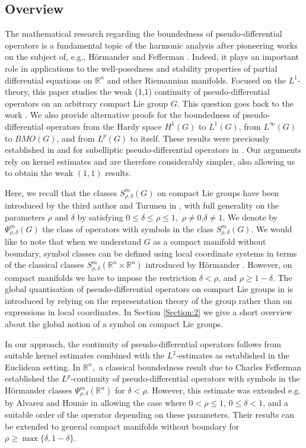 \documentclass[12pt, reqno]{amsart}
\theoremstyle{definition}
\theoremstyle{remark}
\numberwithin{equation}{section}
\begin{document}
\subsection{Overview} The mathematical research regarding the boundedness of pseudo-differential operators is a fundamental topic of the harmonic analysis after pioneering works on the subject of, e.g., H\"ormander \cite{13,14} and Fefferman \cite{11}. Indeed, it plays an important role in applications to the well-posedness and stability properties of partial differential equations on $\mathbb{R}^n$ and other Riemannian manifolds. Focused on the $L^1$-theory,  this paper studies the weak (1,1) continuity of pseudo-differential operators on an arbitrary compact Lie group $G$. This question goes back to the work \cite{9}.  We also provide alternative proofs for the boundedness of pseudo-differential operators from the Hardy space $H^1(G)$ to $L^1(G)$, from $L^\infty(G)$ to $BMO(G)$, and from $L^p(G)$ to itself. These results were previously established in \cite{9} and for subelliptic pseudo-differential operators in \cite{CR}. Our arguments rely on kernel estimates and are therefore considerably simpler, also allowing us to obtain the weak $(1,1)$ results. 


Here, we recall that the classes $S^m_{\rho,\delta}(G)$ on compact Lie groups have been introduced by the third author and Turunen in \cite{17}, with full generality on the parameters $\rho$ and $\delta$ by satisfying $0\leq \delta\leq \rho\leq 1,$ $\rho\neq 0$,\;$\delta\neq 1.$ We denote by $\Psi^m_{\rho,\delta}(G)$ the class of operators with symbols in the class $S^m_{\rho,\delta}(G)$. We would like to note that when we understand $G$ as a compact manifold without boundary, symbol classes can be defined using local coordinate systems in terms of the classical classes $S^m_{\rho,\delta}(\mathbb{R}^n\times\mathbb{R}^n)$ introduced by H\"ormander \cite{13,14}. However, on compact manifolds we have to impose the restriction $\delta<\rho$, and $\rho\geq 1-\delta$. The global quantisation of pseudo-differential operators on compact Lie groups in \cite{17} is introduced by relying on the representation theory of the group rather than on expressions in local coordinates. In Section \ref{Section:2} we give a short overview about the global notion of a symbol on compact Lie groups. 

In our approach, the continuity of pseudo-differential operators follows from suitable kernel estimates combined  with the $L^2$-estimates \cite{12} as established in the Euclidean setting.  In $\mathbb{R}^n,$ a classical boundedness result due to Charles Fefferman \cite{11} established the $L^p$-continuity of pseudo-differential operators with symbols in the H\"ormander classes $\Psi^m_{\rho,\delta}(\mathbb{R}^n)$ for  $\delta<\rho$. However, this estimate was extended e.g. by Alvarez and Hounie in \cite{1} allowing the case where $0<\rho\leq 1$, $0\leq\delta<1$, and a suitable order of the operator depending on these parameters. Their results can be  extended to general compact manifolds without boundary for $\rho\geq \max\{\delta,1-\delta\}$.  
\end{document}
